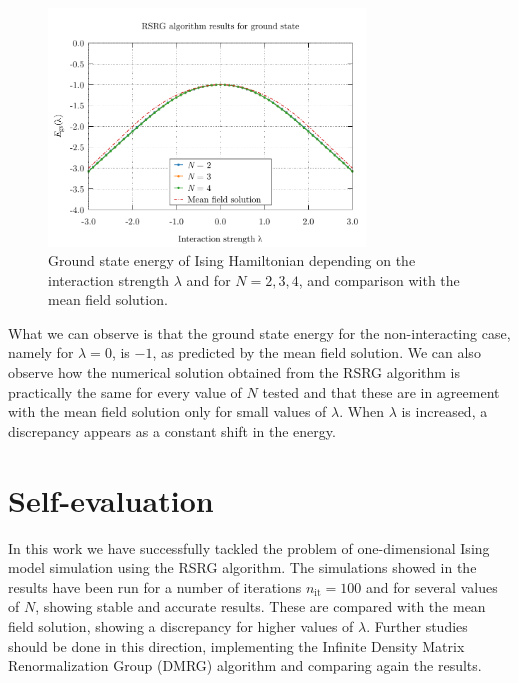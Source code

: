 \documentclass[pra, onecolumn, notitlepage, floats, 11pt]{revtex4-1}
\begin{document}
\begin{figure}[!h]
    \centering
    \includegraphics[width=0.75\textwidth]{images/ising_RSRG_100_I.pdf}
    \caption{Ground state energy of Ising Hamiltonian depending on the interaction strength \( \lambda \) and for \( N = 2, 3, 4 \), and comparison with the mean field solution.}
    \label{fig:10_R_1}
\end{figure}

What we can observe is that the ground state energy for the non-interacting case, namely for \( \lambda = 0 \), is \( -1 \), as predicted by the mean field solution.
We can also observe how the numerical solution obtained from the RSRG algorithm is practically the same for every value of \( N \) tested and that these are in agreement with the mean field solution only for small values of \( \lambda \). When \( \lambda \) is increased, a discrepancy appears as a constant shift in the energy.





\section{Self-evaluation}
In this work we have successfully tackled the problem of one-dimensional Ising model simulation using the RSRG algorithm. The simulations showed in the results have been run for a number of iterations \( n_{\mathrm{it}} = 100 \) and for several values of \( N \), showing stable and accurate results.
These are compared with the mean field solution, showing a discrepancy for higher values of \( \lambda \). Further studies should be done in this direction, implementing the Infinite Density Matrix Renormalization Group (DMRG) algorithm and comparing again the results.
\end{document}
